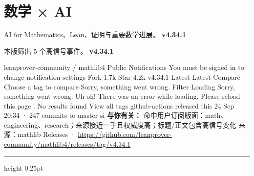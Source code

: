 \documentclass[10.5pt]{ctexart}
\begin{document}
\section*{数学 × AI}
{\color{ormuted} AI for Mathematics、Lean、证明与重要数学进展。}
\vspace{2mm}
{\LARGE\bfseries v4.34.1}\par
\vspace{1mm}
{\color{ormuted} 本版筛出 5 个高信号事件。}
\vspace{3mm}
{\Large\bfseries v4.34.1}\par
leanprover-community / mathlib4 Public Notifications You must be signed in to change notification settings Fork 1.7k Star 4.2k v4.34.1 Latest Latest Compare Choose a tag to compare Sorry, something went wrong. Filter Loading Sorry, something went wrong. Uh oh! There was an error while loading. Please reload this page . No results found View all tags github-actions released this 24 Sep 20:34 · 247 commits to master si
\textbf{与你有关：} 命中用户订阅版面：math、engineering、research；来源接近一手且权威度高；标题/正文包含高信号变化
{\footnotesize\color{ormuted} 来源：mathlib Releases · \url{https://github.com/leanprover-community/mathlib4/releases/tag/v4.34.1}}
\vspace{4mm}
\hrule height 0.25pt
\vspace{3mm}
\end{document}
